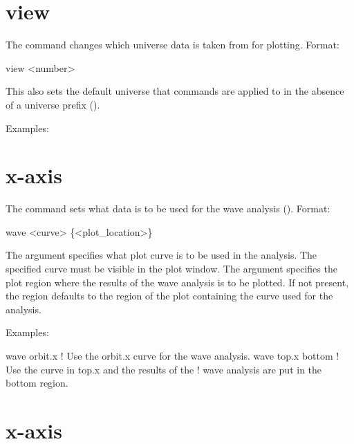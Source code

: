 {{{%
\section{view}
\label{s:view}

The  command changes which universe data is taken from for
plotting. Format:
\begin{example}
  view <number>
\end{example}

\vskip 0.1in 

This also sets the default universe that commands are applied to in
the absence of a universe prefix ().

Examples:

\section{x-axis}
\label{s:wave}

The  command sets what data is to be used for the wave
analysis (). Format:
\begin{example}
  wave <curve> \{<plot_location>\}
\end{example}
\vskip 0.1in

The  argument specifies what plot curve is to be used in
the analysis. The specified curve must be visible in the plot window.
The  argument specifies the plot region where the
results of the wave analysis is to be plotted. If not present, the
region defaults to the region of the plot containing the curve used
for the analysis.

Examples:
\begin{example}
  wave orbit.x      ! Use the orbit.x curve for the wave analysis.
  wave top.x bottom ! Use the curve in top.x and the results of the 
                    !  wave analysis are put in the bottom region.
\end{example}

\section{x-axis}
\label{s:x.axis}

}}}
